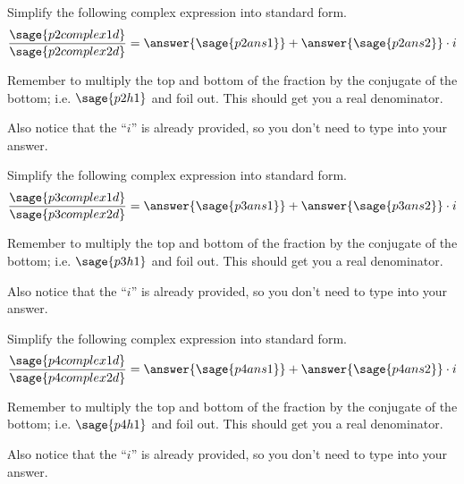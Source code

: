\documentclass{ximera}
\begin{document}
\begin{problem}
    Simplify the following complex expression into standard form.
    \[
        \frac{\sage{p2complex1d}}{\sage{p2complex2d}} = \answer{\sage{p2ans1}} + \answer{\sage{p2ans2}}\cdot i
    \]
    \begin{feedback}
        Remember to multiply the top and bottom of the fraction by the conjugate of the bottom; i.e. $\sage{p2h1}$ and foil out. This should get you a real denominator.
        
        Also notice that the ``$i$'' is already provided, so you don't need to type into your answer.
    \end{feedback}
    
\end{problem}


\begin{problem}
    Simplify the following complex expression into standard form.
    \[
        \frac{\sage{p3complex1d}}{\sage{p3complex2d}} = \answer{\sage{p3ans1}} + \answer{\sage{p3ans2}}\cdot i
    \]
    \begin{feedback}
        Remember to multiply the top and bottom of the fraction by the conjugate of the bottom; i.e. $\sage{p3h1}$ and foil out. This should get you a real denominator.
        
        Also notice that the ``$i$'' is already provided, so you don't need to type into your answer.
    \end{feedback}
    
\end{problem}


\begin{problem}
    Simplify the following complex expression into standard form.
    \[
        \frac{\sage{p4complex1d}}{\sage{p4complex2d}} = \answer{\sage{p4ans1}} + \answer{\sage{p4ans2}}\cdot i
    \]
    \begin{feedback}
        Remember to multiply the top and bottom of the fraction by the conjugate of the bottom; i.e. $\sage{p4h1}$ and foil out. This should get you a real denominator.
        
        Also notice that the ``$i$'' is already provided, so you don't need to type into your answer.
    \end{feedback}
    
\end{problem}
\end{document}
